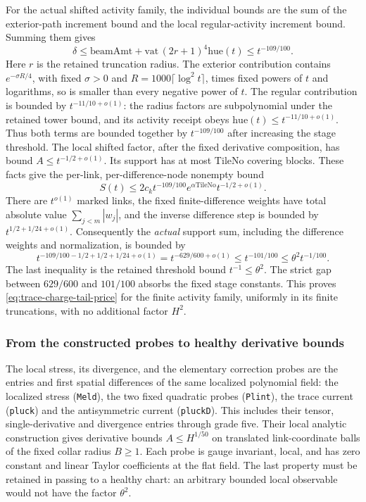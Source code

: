 For the actual shifted activity family, the individual bounds are the
sum of the exterior-path increment bound and the local regular-activity
increment bound. Summing them gives
\[
 \delta\le\mathrm{beamAmt}+\mathrm{vat}\,
                  (2r+1)^4\mathrm{hue}(t)\le t^{-109/100}.
\]
Here $r$ is the retained truncation radius. The exterior contribution
contains $e^{-\sigma R/4}$, with fixed $\sigma>0$ and
$R=1000\lceil\log^2t\rceil$, times fixed powers of $t$ and logarithms,
so is smaller than every negative power of $t$.
The regular contribution is bounded by $t^{-11/10+o(1)}$: the radius factors
are subpolynomial under the retained tower bound, and its activity
receipt obeys $\mathrm{hue}(t)\le t^{-11/10+o(1)}$. Thus both terms are
bounded together by $t^{-109/100}$ after increasing the stage threshold.
The local shifted factor, after the fixed derivative composition, has
bound $A\le t^{-1/2+o(1)}$. Its support has at most $\mathrm{TileNo}$
covering blocks. These facts give the per-link, per-difference-node
nonempty bound
\[
 S(t)\le2c_k t^{-109/100}
                e^{\alpha\mathrm{TileNo}}t^{-1/2+o(1)}.
\]
There are $t^{o(1)}$ marked links, the fixed finite-difference weights
have total absolute value $\sum_{j<m}|w_j|$, and the inverse difference
step is bounded by $t^{1/2+1/24+o(1)}$. Consequently the \emph{actual} support sum,
including the difference weights and normalization, is bounded by
\[
 t^{-109/100-1/2+1/2+1/24+o(1)}
   =t^{-629/600+o(1)}\le t^{-101/100}
   \le\theta^2t^{-1/100}.
\]
The last inequality is the retained threshold bound $t^{-1}\le\theta^2$.
The strict gap between $629/600$ and $101/100$ absorbs the fixed stage
constants. This proves \eqref{eq:trace-charge-tail-price} for the finite
activity family, uniformly in its finite truncations, with no additional
factor $H^2$.

\subsubsection{From the constructed probes to healthy derivative bounds}
\label{subsec:trace-charge-healthy-prices}

The local stress, its divergence, and the elementary correction probes
are the entries and first spatial differences of the same localized
polynomial field: the localized stress (\texttt{Meld}), the two fixed
quadratic probes (\texttt{Plint}), the trace current (\texttt{pluck})
and the antisymmetric current (\texttt{pluckD}). This includes their
tensor, single-derivative and divergence entries through grade five. Their local analytic construction gives derivative
bounds $A\le H^{1/50}$ on translated link-coordinate balls of the fixed
collar radius $B\ge1$. Each probe is gauge invariant, local, and has
zero constant and linear Taylor coefficients at the flat field. The
last property must be retained in passing to a healthy chart: an
arbitrary bounded local observable would not have the factor $\theta^2$.

